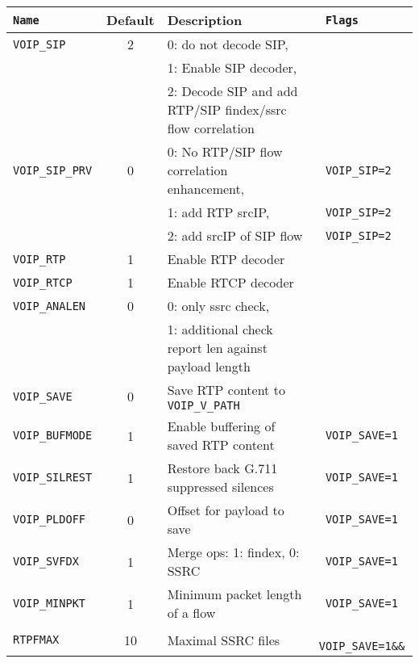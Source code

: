 \documentclass[documentation]{subfiles}
\begin{document}
\begin{longtable}{>{\tt}lcl>{\tt\small}l}
    \toprule
    {\bf Name} & {\bf Default} & {\bf Description} & {\bf Flags}\\
    \midrule\endhead%
    VOIP\_SIP      &    2 & 0: do not decode SIP,                                              & \\
                   &      & 1: Enable SIP decoder,                                             & \\
                   &      & 2: Decode SIP and add RTP/SIP findex/ssrc flow correlation         & \\
    VOIP\_SIP\_PRV &    0 & 0: No RTP/SIP flow correlation enhancement,                        & VOIP\_SIP=2\\
                   &      & 1: add RTP srcIP,                                                  & VOIP\_SIP=2\\
                   &      & 2: add srcIP of SIP flow                                           & VOIP\_SIP=2\\
    VOIP\_RTP      &    1 & Enable RTP decoder                                                 & \\
    VOIP\_RTCP     &    1 & Enable RTCP decoder                                                & \\
    VOIP\_ANALEN   &    0 & 0: only ssrc check,                                                & \\
                   &      & 1: additional check report len against payload length              & \\
    VOIP\_SAVE     &    0 & Save RTP content to {\tt\small VOIP\_V\_PATH}                      & \\
    VOIP\_BUFMODE  &    1 & Enable buffering of saved RTP content                              & VOIP\_SAVE=1\\
    VOIP\_SILREST  &    1 & Restore back G.711 suppressed silences                             & VOIP\_SAVE=1\\
    VOIP\_PLDOFF   &    0 & Offset for payload to save                                         & VOIP\_SAVE=1\\
    VOIP\_SVFDX    &    1 & Merge ops: 1: findex, 0: SSRC                                      & VOIP\_SAVE=1\\
    VOIP\_MINPKT   &    1 & Minimum packet length of a flow                                    & VOIP\_SAVE=1\\
    RTPFMAX        &   10 & Maximal SSRC files                                                 & VOIP\_SAVE=1\&\&\\

\end{longtable}
\end{document}
